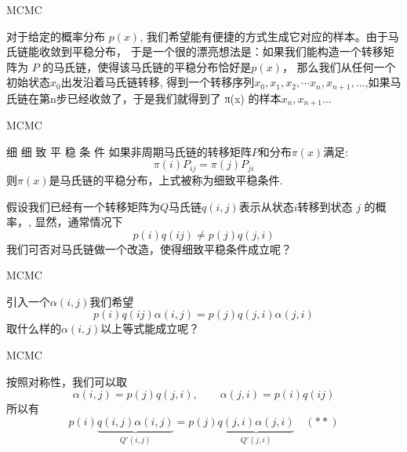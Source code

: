 \documentclass{beamer}
\begin{document}
\begin{CJK*}{UTF8}{gbsn}
\begin{frame}{MCMC}
\begin{center}
对于给定的概率分布 $p(x)$, 我们希望能有便捷的方式生成它对应的样本。由于马氏链能收敛到平稳分布， 于是一个很的漂亮想法是：如果我们能构造一个转移矩阵为 $P$ 的马氏链，使得该马氏链的平稳分布恰好是$ p(x)$， 那么我们从任何一个初始状态$x_0$出发沿着马氏链转移, 得到一个转移序列$ x_0,x_1,x_2,⋯x_n,x_{n+1},\dots$,如果马氏链在第n步已经收敛了，于是我们就得到了 π(x) 的样本$ x_n,x_{n+1}\dots$
\end{center}
\end{frame}

\begin{frame}{MCMC}
\begin{block}{细
细 致 平 稳 条 件}
   如果非周期马氏链的转移矩阵$P$和分布$\pi(x)$满足:$$\pi(i)P_{ij}=\pi(j)P_{ji}$$则$\pi(x)$是马氏链的平稳分布，上式被称为细致平稳条件.
\end{block}

假设我们已经有一个转移矩阵为$Q$马氏链$q(i,j)$表示从状态$i$转移到状态 $j$ 的概率，, 显然，通常情况下\[p(i)q(ij)\neq p(j)q(j,i)\]我们可否对马氏链做一个改造，使得细致平稳条件成立呢？
\end{frame}


\begin{frame}{MCMC}
\begin{center}
引入一个$\alpha(i,j)$我们希望\[p(i)q(ij)\alpha(i,j)= p(j)q(j,i)\alpha(j,i)\]取什么样的$\alpha(i,j)$以上等式能成立呢？
\end{center}
\end{frame}

\begin{frame}{MCMC}
\begin{center}
按照对称性，我们可以取\[\alpha(i,j)=p(j)q(j,i),\qquad \alpha(j,i)=p(i)q(ij)\]所以有
\begin{equation}
\label{detailed-balance}
p(i) \underbrace{q(i,j)\alpha(i,j)}_{Q'(i,j)}
= p(j) \underbrace{q(j,i)\alpha(j,i)}_{Q'(j,i)} \quad (**)
\end{equation}
\end{center}
\end{frame}




\end{CJK*}
\end{document}

